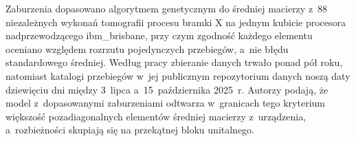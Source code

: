 Zaburzenia dopasowano algorytmem genetycznym do średniej macierzy z~88 niezależnych wykonań tomografii procesu bramki $\mathrm{X}$ na jednym kubicie procesora nadprzewodzącego ibm\_brisbane, przy czym zgodność każdego elementu oceniano względem rozrzutu pojedynczych przebiegów, a~nie błędu standardowego średniej.
Według pracy zbieranie danych trwało ponad pół roku, natomiast katalogi przebiegów w~jej publicznym repozytorium danych noszą daty dziewięciu dni między 3~lipca a~15~października 2025~r.
Autorzy podają, że model z~dopasowanymi zaburzeniami odtwarza w~granicach tego kryterium większość pozadiagonalnych elementów średniej macierzy z~urządzenia, a~rozbieżności skupiają się na przekątnej bloku unitalnego.

